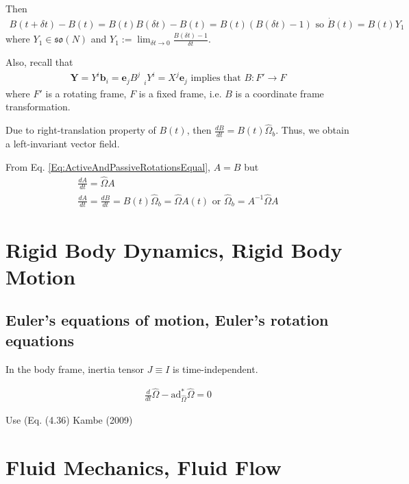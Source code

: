 \documentclass[10pt]{amsart}
\begin{document}
\begin{multicols*}{2}
Then 
\[
\begin{gathered}
	B(t+ \delta t) - B(t) = B(t) B(\delta t) - B(t) = B(t) (B(\delta t) - 1) \text{ so } \dot{B}(t) = B(t) Y_1
\end{gathered}
\]
where $Y_1 \in \mathfrak{so}(N)$ and $Y_1 := \lim_{\delta t \to 0} \frac{B(\delta t) - 1 }{ \delta t}$.


Also, recall that
\[
\begin{gathered}
	\mathbf{Y} = Y^i \mathbf{b}_i = \mathbf{e}_j B^j_{\quad i} Y^i = X^j \mathbf{e}_j \text{ implies that } B:F' \to F
\end{gathered}
\]
where $F'$ is a rotating frame, $F$ is a fixed frame, i.e. $B$ is a coordinate frame transformation.

Due to right-translation property of $B(t)$, then $\frac{dB}{dt} = B(t) \widehat{\Omega}_b$. Thus, we obtain a left-invariant vector field.

From Eq. \ref{Eq:ActiveAndPassiveRotationsEqual}, $A = B$ but
\begin{equation}
	\begin{gathered}
		\frac{dA}{dt} = \widehat{\Omega} A \\
		\frac{dA}{dt} = \frac{dB}{dt} = B(t) \widehat{\Omega}_b = \widehat{\Omega}A(t) \text{ or } \widehat{\Omega}_b = A^{-1} \widehat{\Omega} A
	\end{gathered}
\end{equation}

\section{Rigid Body Dynamics, Rigid Body Motion}

\subsection{Euler's equations of motion, Euler's rotation equations}

In the body frame, inertia tensor $J \equiv I$ is time-independent.

\[
\begin{gathered}
\frac{d}{dt} \widehat{\Omega} - \text{ad}^*_{\widehat{\Omega}} \widehat{\Omega} = 0 
\end{gathered}
\]

Use (Eq. (4.36) Kambe (2009) \cite{TKambe2009}

\section{Fluid Mechanics, Fluid Flow}


\end{multicols*}
\end{document}
